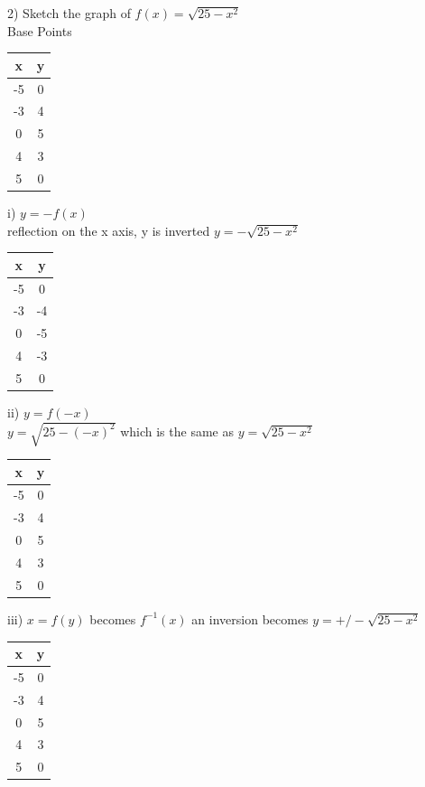 \documentclass[10pt]{article}
\begin{document}
2) Sketch the graph of \(f(x) = \sqrt{25-x^2}\) \\
Base Points \\ 
\begin{tabular}{|c|c|}
    \hline
    x  & y  \\
    \hline
    -5 & 0  \\
    -3 & 4  \\
    0 & 5   \\
    4 & 3  \\
    5 & 0  \\
    \hline
\end{tabular} 


i) \(y = -f(x)\) \\
reflection on the x axis, y is inverted \(y = -\sqrt{25-x^2}\)\\
\begin{tabular}{|c|c|}
    \hline
    x  & y  \\
    \hline
    -5 & 0  \\
    -3 & -4  \\
    0 & -5   \\
    4 & -3  \\
    5 & 0  \\
    \hline
\end{tabular} 
\clearpage

ii) \(y = f(-x)\) \\
 \(y = \sqrt{25-(-x)^2}\) which is the same as \(y = \sqrt{25-x^2}\)  \\
\begin{tabular}{|c|c|}
    \hline
    x  & y  \\
     \hline
    -5 & 0  \\
    -3 & 4  \\
    0 & 5   \\
    4 & 3  \\
    5 & 0  \\
    \hline
\end{tabular} 

iii) \(x = f(y)\) becomes \(f^{-1}(x)\) an inversion becomes \(y = +/-\sqrt{25-x^2}\)   \\
\begin{tabular}{|c|c|}
    \hline
    x  & y  \\
    \hline
    -5 & 0  \\
    -3 & 4  \\
    0 & 5   \\
    4 & 3  \\
    5 & 0  \\
    \hline
\end{tabular} 
\end{document}
